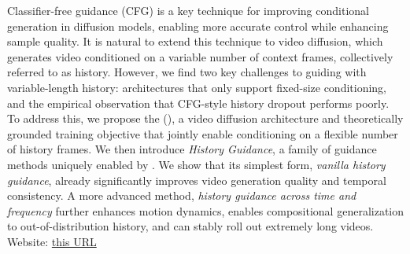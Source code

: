 Classifier-free guidance (CFG) is a key technique for improving conditional generation in diffusion models, enabling more accurate control while enhancing sample quality. It is natural to extend this technique to video diffusion, which generates video conditioned on a variable number of context frames,  collectively referred to as history. However, we find two key challenges to guiding with variable-length history: architectures that only support fixed-size conditioning, and the empirical observation that CFG-style history dropout performs poorly.  To address this, we propose the \method (\mtd), a video diffusion architecture and theoretically grounded training objective that jointly enable conditioning on a flexible number of history frames. We then introduce \emph{History Guidance}, a family of guidance methods uniquely enabled by \mtd. We show that its simplest form, \emph{vanilla history guidance}, already significantly improves video generation quality and temporal consistency. A more advanced method, 
\emph{history guidance across time and frequency} further enhances motion dynamics, enables compositional generalization to out-of-distribution history, and can stably roll out extremely long videos. Website: \href{https://boyuan.space/history-guidance}{{this URL}}
